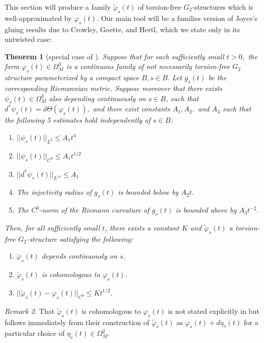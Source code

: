 \documentclass{amsart}
\theoremstyle{theorem}
\newtheorem{theorem}{Theorem}[section]
\theoremstyle{definition}
\theoremstyle{definition}
\theoremstyle{definition}
\theoremstyle{theorem}
\theoremstyle{theorem}
\theoremstyle{theorem}
\theoremstyle{corollary}
\theoremstyle{question}
\theoremstyle{remark}
\newtheorem{remark}[theorem]{Remark}
\begin{document}
This section will produce a family $\widetilde{\varphi}_s(t)$ of torsion-free $G_2$-structures which is well-approximated by $\varphi_s(t).$ Our main tool will be a families version of Joyce's gluing results \cite[Theorems 11.6.1, G1, G2]{Joycebook} due to Crowley, Goette, and Hertl, which we state only in its untwisted case:

\begin{theorem}[special case of {\cite[Theorem 6.2]{CGH}}]
    Suppose that for each sufficiently small $t>0,$ the form $\varphi_s(t) \in \Omega^3_M$ is a continuous family of not necessarily torsion-free $G_2$ structure parameterized by a compact space $B, s\in B.$ Let $g_s(t)$ be the corresponding Riemannian metric. Suppose moreover that there exists $\psi_s(t) \in \Omega^3_M$ also depending continuously on $s\in B$, such that $d^*\psi_s(t) = d\Theta(\varphi_s(t)),$ and there exist constants $A_1, A_2,$ and $A_3$ such that the following 5 estimates hold independently of $s\in B$: \begin{enumerate}
        \item $||\psi_s(t)||_{L^2}\leq A_1 t^4$
        \item $||\psi_s(t)||_{C^0}\leq A_1 t^{1/2}$
        \item $||d^*\psi_s(t)||_{L^{14}}\leq A_1$
        \item The injectivity radius of $g_s(t)$ is bounded below by $A_2t.$
        \item The $C^0$-norm of the Riemann curvature of $g_s(t)$ is bounded above by $A_3t^{-2}.$ 
    \end{enumerate}
    Then, for all sufficiently small $t$, there exists a constant $K$ and $\widetilde{\varphi}_s(t)$ a torsion-free $G_2$-structure satisfying the following: \begin{enumerate}
        \item $\widetilde{\varphi}_s(t)$ depends continuously on $s.$
        \item $\widetilde{\varphi}_s(t)$ is cohomologous to $\varphi_s(t).$
        \item $||\widetilde{\varphi}_s(t) - \varphi_s(t)||_{C^0}\leq Kt^{1/2}.$
    \end{enumerate}
\end{theorem}

\begin{remark}
    That $\widetilde{\varphi}_s(t)$ is cohomologous to $\varphi_s(t)$ is not stated explicitly in \cite{CGH} but follows immediately from their construction of $\widetilde{\varphi}_s(t)$ as $\varphi_s(t)+d\eta_s(t)$ for a particular choice of $\eta_s(t)\in\Omega^2_M.$
\end{remark}
\end{document}
